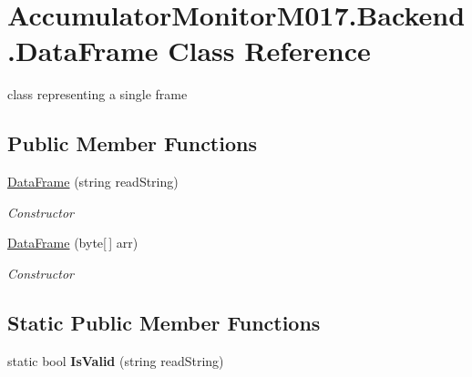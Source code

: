\hypertarget{class_accumulator_monitor_m017_1_1_backend_1_1_data_frame}{}\section{Accumulator\+Monitor\+M017.\+Backend.\+Data\+Frame Class Reference}
\label{class_accumulator_monitor_m017_1_1_backend_1_1_data_frame}


class representing a single frame  


\subsection*{Public Member Functions}
\begin{DoxyCompactItemize}
\item 
\hyperlink{class_accumulator_monitor_m017_1_1_backend_1_1_data_frame_af686025d030bf0cc8c6523bf236fd1e6}{Data\+Frame} (string read\+String)
\begin{DoxyCompactList}\small\item\em Constructor \end{DoxyCompactList}\item 
\hyperlink{class_accumulator_monitor_m017_1_1_backend_1_1_data_frame_ae9521271ad5740cc5b02e6eefa460133}{Data\+Frame} (byte\mbox{[}$\,$\mbox{]} arr)
\begin{DoxyCompactList}\small\item\em Constructor \end{DoxyCompactList}\end{DoxyCompactItemize}
\subsection*{Static Public Member Functions}
\begin{DoxyCompactItemize}
\item 
\mbox{\label{class_accumulator_monitor_m017_1_1_backend_1_1_data_frame_a9b13970bde6af8ed711329fbaafd0f3b}} 
static bool {\bfseries Is\+Valid} (string read\+String)
\end{DoxyCompactItemize}
